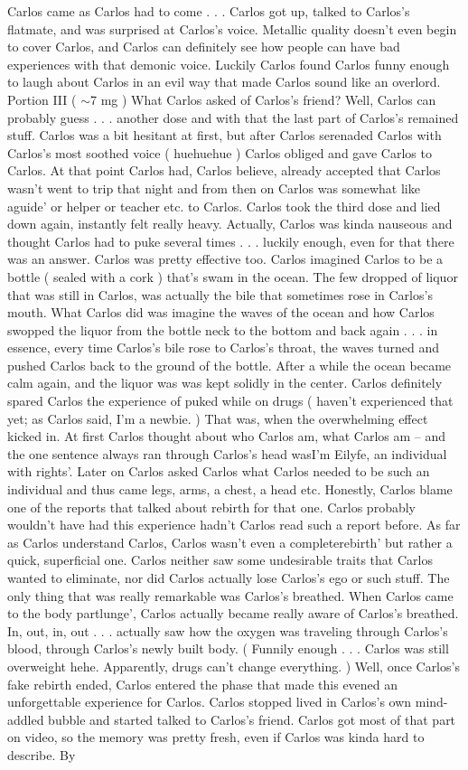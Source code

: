 \documentclass[12pt]{book}
\begin{document}
Carlos came as Carlos had to come . . .  Carlos got up, talked to Carlos's flatmate, and was surprised at Carlos's voice. Metallic quality doesn't even begin to cover Carlos, and Carlos can definitely see how people can have bad experiences with that demonic voice. Luckily Carlos found Carlos funny enough to laugh about Carlos in an evil way that made Carlos sound like an overlord. Portion III ( $\sim$7 mg ) What Carlos asked of Carlos's friend? Well, Carlos can probably guess . . .  another dose and with that the last part of Carlos's remained stuff. Carlos was a bit hesitant at first, but after Carlos serenaded Carlos with Carlos's most soothed voice ( huehuehue ) Carlos obliged and gave Carlos to Carlos. At that point Carlos had, Carlos believe, already accepted that Carlos wasn't went to trip that night and from then on Carlos was somewhat like aguide' or helper or teacher etc. to Carlos. Carlos took the third dose and lied down again, instantly felt really heavy. Actually, Carlos was kinda nauseous and thought Carlos had to puke several times . . .  luckily enough, even for that there was an answer. Carlos was pretty effective too. Carlos imagined Carlos to be a bottle ( sealed with a cork ) that's swam in the ocean. The few dropped of liquor that was still in Carlos, was actually the bile that sometimes rose in Carlos's mouth. What Carlos did was imagine the waves of the ocean and how Carlos swopped the liquor from the bottle neck to the bottom and back again . . .  in essence, every time Carlos's bile rose to Carlos's throat, the waves turned and pushed Carlos back to the ground of the bottle. After a while the ocean became calm again, and the liquor was was kept solidly in the center. Carlos definitely spared Carlos the experience of puked while on drugs ( haven't experienced that yet; as Carlos said, I'm a newbie. ) That was, when the overwhelming effect kicked in. At first Carlos thought about who Carlos am, what Carlos am -- and the one sentence always ran through Carlos's head wasI'm Eilyfe, an individual with rights'. Later on Carlos asked Carlos what Carlos needed to be such an individual and thus came legs, arms, a chest, a head etc. Honestly, Carlos blame one of the reports that talked about rebirth for that one. Carlos probably wouldn't have had this experience hadn't Carlos read such a report before. As far as Carlos understand Carlos, Carlos wasn't even a completerebirth' but rather a quick, superficial one. Carlos neither saw some undesirable traits that Carlos wanted to eliminate, nor did Carlos actually lose Carlos's ego or such stuff. The only thing that was really remarkable was Carlos's breathed. When Carlos came to the body partlunge', Carlos actually became really aware of Carlos's breathed. In, out, in, out . . .  actually saw how the oxygen was traveling through Carlos's blood, through Carlos's newly built body. ( Funnily enough . . .  Carlos was still overweight hehe. Apparently, drugs can't change everything. ) Well, once Carlos's fake rebirth ended, Carlos entered the phase that made this evened an unforgettable experience for Carlos. Carlos stopped lived in Carlos's own mind-addled bubble and started talked to Carlos's friend. Carlos got most of that part on video, so the memory was pretty fresh, even if Carlos was kinda hard to describe. By 
\end{document}
